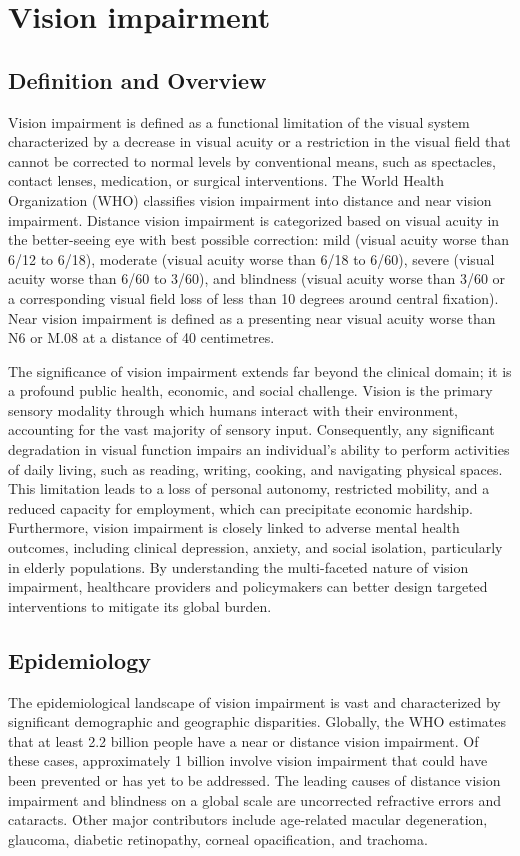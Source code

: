 \chapter{Vision impairment}

\section*{Definition and Overview}
Vision impairment is defined as a functional limitation of the visual system characterized by a decrease in visual acuity or a restriction in the visual field that cannot be corrected to normal levels by conventional means, such as spectacles, contact lenses, medication, or surgical interventions. The World Health Organization (WHO) classifies vision impairment into distance and near vision impairment. Distance vision impairment is categorized based on visual acuity in the better-seeing eye with best possible correction: mild (visual acuity worse than 6/12 to 6/18), moderate (visual acuity worse than 6/18 to 6/60), severe (visual acuity worse than 6/60 to 3/60), and blindness (visual acuity worse than 3/60 or a corresponding visual field loss of less than 10 degrees around central fixation). Near vision impairment is defined as a presenting near visual acuity worse than N6 or M.08 at a distance of 40 centimetres.

The significance of vision impairment extends far beyond the clinical domain; it is a profound public health, economic, and social challenge. Vision is the primary sensory modality through which humans interact with their environment, accounting for the vast majority of sensory input. Consequently, any significant degradation in visual function impairs an individual's ability to perform activities of daily living, such as reading, writing, cooking, and navigating physical spaces. This limitation leads to a loss of personal autonomy, restricted mobility, and a reduced capacity for employment, which can precipitate economic hardship. Furthermore, vision impairment is closely linked to adverse mental health outcomes, including clinical depression, anxiety, and social isolation, particularly in elderly populations. By understanding the multi-faceted nature of vision impairment, healthcare providers and policymakers can better design targeted interventions to mitigate its global burden.

\section*{Epidemiology}
The epidemiological landscape of vision impairment is vast and characterized by significant demographic and geographic disparities. Globally, the WHO estimates that at least 2.2 billion people have a near or distance vision impairment. Of these cases, approximately 1 billion involve vision impairment that could have been prevented or has yet to be addressed. The leading causes of distance vision impairment and blindness on a global scale are uncorrected refractive errors and cataracts. Other major contributors include age-related macular degeneration, glaucoma, diabetic retinopathy, corneal opacification, and trachoma.

